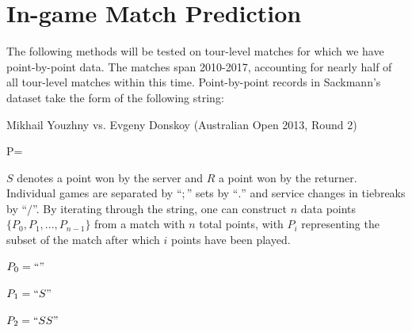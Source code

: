 \documentclass[chapterprefix=false]{report}
\begin{document}





\chapter{In-game Match Prediction}


The following methods will be tested on tour-level matches for which we have point-by-point data. The matches span 2010-2017, accounting for nearly half of all tour-level matches within this time. Point-by-point records in Sackmann's dataset take the form of the following string:

Mikhail Youzhny vs. Evgeny Donskoy (Australian Open 2013, Round 2)

P=


$S$ denotes a point won by the server and $R$ a point won by the returner. Individual games are separated by ``$;$'' sets by ``$.$'' and service changes in tiebreaks by ``$/$''. By iterating through the string, one can construct $n$ data points $\{P_0,P_1,...,P_{n-1}\}$ from a match with $n$ total points, with $P_i$ representing the subset of the match after which $i$ points have been played.

$P_0 = ``"$

$P_1 = ``S"$

$P_2 = ``SS"$
\end{document}

